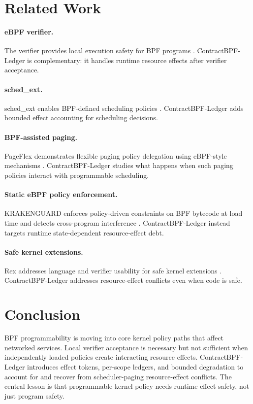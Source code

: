 \documentclass[letterpaper,twocolumn,10pt]{article}
\newcommand{\sys}{ContractBPF-Ledger\xspace}
\begin{document}
\section{Related Work}

\paragraph{eBPF verifier.}
The verifier provides local execution safety for BPF programs \cite{linuxVerifier}. \sys is complementary: it handles runtime resource effects after verifier acceptance.

\paragraph{sched\_ext.}
sched\_ext enables BPF-defined scheduling policies \cite{linuxSchedExt}. \sys adds bounded effect accounting for scheduling decisions.

\paragraph{BPF-assisted paging.}
PageFlex demonstrates flexible paging policy delegation using eBPF-style mechanisms \cite{pageflex2025}. \sys studies what happens when such paging policies interact with programmable scheduling.

\paragraph{Static eBPF policy enforcement.}
KRAKENGUARD enforces policy-driven constraints on BPF bytecode at load time and detects cross-program interference \cite{krakenguard2026}. \sys instead targets runtime state-dependent resource-effect debt.

\paragraph{Safe kernel extensions.}
Rex addresses language and verifier usability for safe kernel extensions \cite{rex2025}. \sys addresses resource-effect conflicts even when code is safe.

\section{Conclusion}

BPF programmability is moving into core kernel policy paths that affect networked services. Local verifier acceptance is necessary but not sufficient when independently loaded policies create interacting resource effects. \sys introduces effect tokens, per-scope ledgers, and bounded degradation to account for and recover from scheduler-paging resource-effect conflicts. The central lesson is that programmable kernel policy needs runtime effect safety, not just program safety.



\end{document}
